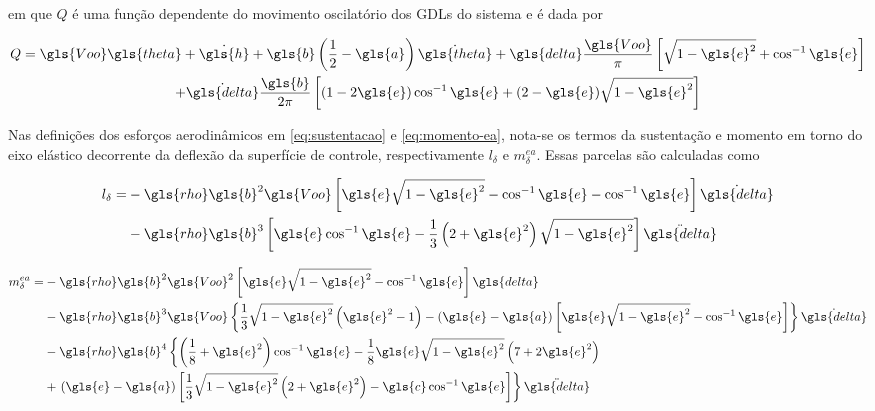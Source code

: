 \noindent em que $Q$ é uma função dependente do movimento oscilatório dos \gls{GDL}s do sistema e é dada por

\begin{multline}\label{eq:funcaoQ}
    Q = \gls{Voo}\gls{theta} + \dot{\gls{h}} + \gls{b}\left( \frac{1}{2} - \gls{a} \right)\dot{\gls{theta}} + \gls{delta}\frac{\gls{Voo}}{\pi}\left[ \sqrt{1-\gls{e}^{2}} + \cos^{-1}{\gls{e}} \right] \\ + \dot{\gls{delta}}\frac{\gls{b}}{2\pi}\left[ \left( 1 - 2\gls{e} \right)\cos^{-1}{\gls{e}} + (2-\gls{e})\sqrt{1-\gls{e}^{2}}\right]  
\end{multline}

Nas definições dos esforços aerodinâmicos em \eqref{eq:sustentacao} e \eqref{eq:momento-ea}, nota-se os termos da sustentação e momento em torno do eixo elástico decorrente da deflexão da superfície de controle, respectivamente $l_{\delta}$ e $m_{\delta}^{ea}$. Essas parcelas são calculadas como


\begin{align}\label{eq:sustentacao-delta}
\begin{split}
    l_{\delta} = &-\gls{rho}\gls{b}^{2}\gls{Voo} \left[ \gls{e}\sqrt{1-\gls{e}^{2}}-\cos^{-1}{\gls{e}} - \cos^{-1}{\gls{e}} \right]\dot{\gls{delta}} \\ &- \gls{rho}\gls{b}^{3}\left[ \gls{e}\cos^{-1}{\gls{e}} - \frac{1}{3}\left(2 + \gls{e}^{2} \right)\sqrt{1-\gls{e}^{2}} \right]\ddot{\gls{delta}}
\end{split}
\end{align}

\begin{align}\label{eq:momento-delta}
\begin{split}
    m_{\delta}^{ea} = &-\gls{rho}\gls{b}^{2}\gls{Voo}^{2} \left[ \gls{e}\sqrt{1-\gls{e}^{2}}-\cos^{-1}{\gls{e}} \right]\gls{delta} \\
        &-\gls{rho}\gls{b}^{3}\gls{Voo} \left\{ \frac{1}{3}\sqrt{1-\gls{e}^{2}}\left(\gls{e}^{2}-1\right) - \left(\gls{e}-\gls{a}\right)\left[ \gls{e}\sqrt{1-\gls{e}^{2}}-\cos^{-1}{\gls{e}} \right] \right\}\dot{\gls{delta}} \\
        &-\gls{rho}\gls{b}^{4}\left\{ \left(\frac{1}{8}+\gls{e}^{2}\right)\cos^{-1}{\gls{e}} -  \frac{1}{8}\gls{e}\sqrt{1-\gls{e}^{2}}\left(7+2\gls{e}^{2}\right) \right. \\ &+  \left. \left(\gls{e}-\gls{a}\right)\left[\frac{1}{3}\sqrt{1-\gls{e}^{2}}\left(2+\gls{e}^{2}\right) - \gls{c}\cos^{-1}{\gls{e}} \right] \right\} \ddot{\gls{delta}}
\end{split}
\end{align}

